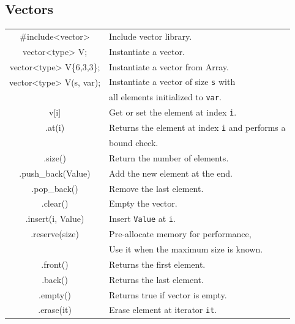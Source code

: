 \documentclass[5pt]{article}
\begin{document}
\begin{multicols}{2}
\subsection{Vectors}
\begin{tabular}{C L}
\#include<vector>           & Include vector library. \\
vector<type> V;             & Instantiate a vector. \\
vector<type> V\{6,3,3\};    & Instantiate a vector from Array. \\
vector<type> V(s, var);     & Instantiate a vector of size \texttt{s} with \\
                            & all elements initialized to \texttt{var}. \\
v[i]                        & Get or set the element at index \texttt{i}.\\    
.at(i)                      & Returns the element at index \texttt{i} and performs a\\
                            & bound check. \\
.size()                     & Return the number of elements. \\
.push\_back(Value)          & Add the new element at the end. \\
.pop\_back()                & Remove the last element. \\
.clear()                    & Empty the vector. \\
.insert(i, Value)           & Insert \texttt{Value} at \texttt{i}. \\
.reserve(size)              & Pre-allocate memory for performance, \\
                            & Use it when the maximum size is known. \\
.front()                    & Returns the first element. \\
.back()                     & Returns the last element. \\
.empty()                    & Returns true if vector is empty. \\
.erase(it)                  & Erase element at iterator \texttt{it}. \\
\end{tabular}


\end{multicols}
\end{document}
